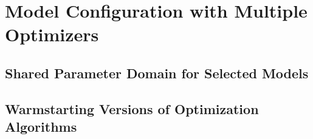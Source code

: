 \Blindtext

\section{Model Configuration with Multiple Optimizers}
\label{sec:approach:configuration}

\Blindtext

\subsection{Shared Parameter Domain for Selected Models}
\label{sec:appraoch:configuration:parameter}

\Blindtext

\subsection{Warmstarting Versions of Optimization Algorithms}
\label{sec:appraoch:configuration:warmstart}

\Blindtext